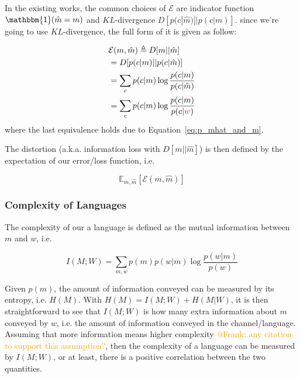 \documentclass[11pt]{article}
\begin{document}
In the existing works, the common choices of $\mathcal{E}$ are indicator function $\mathbbm{1}(\hat{m}=m)$ and $KL$-divergence $D[p(c|\hat{m})||p(c|m)]$.
since we're going to use $KL$-divergence, the full form of it is given as follow:

\begin{equation}
\begin{split}
    & \mathcal{E}(m,\hat{m}) \triangleq  D[m||\hat{m}] \\
    & = D[p(c|m)||p(c|\hat{m})]  \\
    & = \sum_{c} p(c|m) \log \frac{p(c|m)}{p(c|\hat{m})} \\
     & = \sum_{c} p(c|m) \log \frac{p(c|m)}{p(c|\textcolor{red}{w})}
\end{split}
\label{eq:comm_loss_function}
\end{equation}
where the last equivalence holds due to Equation~\ref{eq:p_mhat_and_m}.

The distortion (a.k.a. information loss with $D[m||\hat{m}]$) is then defined by the expectation of our error/loss function, i.e.

\begin{equation}
    \mathbb{E}_{m,\hat{m}}\left[\mathcal{E}(m,\hat{m})\right]
    \label{eq:distortion}
\end{equation}


\subsubsection{Complexity of Languages}
\label{ssec:complexity}

The complexity of our a language is defined as the mutual information between $m$ and $w$, i.e. 

\begin{equation}
    I(M;W) = \sum_{m,w} p(m)p(w|m)\log \frac{p(w|m)}{p(w)}
    \label{eq:complexity_definition}
\end{equation}

Given $p(m)$, the amount of information conveyed can be measured by its entropy, i.e. $H(M)$.
With $H(M)=I(M;W)+H(M|W)$, it is then straightforward to see that $I(M;W)$ is how many extra information about $m$ conveyed by $w$, i.e. the amount of information conveyed in the channel/language.
Assuming that more information means higher complexity \textcolor{orange}{@Frank: any citation to support this assumption?}, then the complexity of a language can be measured by $I(M;W)$,
or at least, there is a positive correlation between the two quantities.
\end{document}
